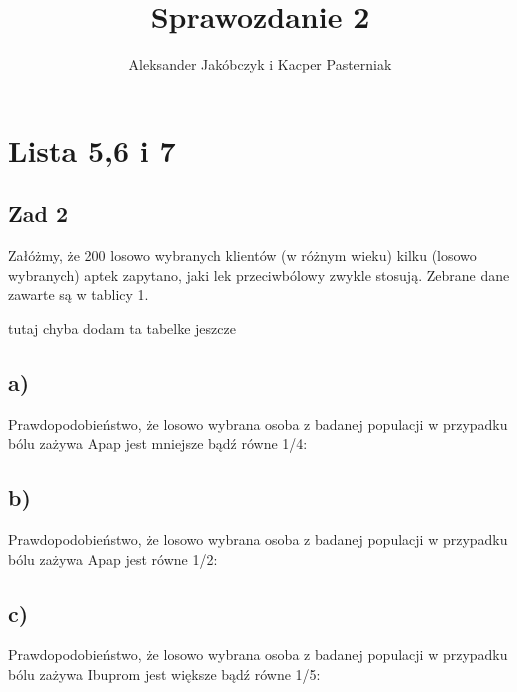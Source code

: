 \documentclass[12pt]{mwart}\usepackage[]{graphicx}\usepackage[]{color}
\title{Sprawozdanie 2}
\author{Aleksander Jakóbczyk i Kacper Pasterniak}
\date{}
\makeatletter
\newenvironment{kframe}{%
 \def\at@end@of@kframe{}%
 \ifinner\ifhmode%
  \def\at@end@of@kframe{\end{minipage}}%
  \begin{minipage}{\columnwidth}%
 \fi\fi%
 \def\FrameCommand##1{\hskip\@totalleftmargin \hskip-\fboxsep
 \colorbox{shadecolor}{##1}\hskip-\fboxsep
     \hskip-\linewidth \hskip-\@totalleftmargin \hskip\columnwidth}%
 \MakeFramed {\advance\hsize-\width
   \@totalleftmargin\z@ \linewidth\hsize
   \@setminipage}}%
 {\par\unskip\endMakeFramed%
 \at@end@of@kframe}
\makeatother
\begin{document}
\maketitle



\section*{Lista 5,6 i 7}
\subsection*{Zad 2}
Załóżmy, że 200 losowo wybranych klientów (w różnym wieku) kilku (losowo wybranych) aptek zapytano, jaki lek przeciwbólowy zwykle stosują. Zebrane dane zawarte
są w tablicy 1.

tutaj chyba dodam ta tabelke jeszcze

\begin{kframe}


{\ttfamily\noindent\bfseries{}}\end{kframe}

\subsection*{a)}
Prawdopodobieństwo, że losowo wybrana osoba z badanej populacji w przypadku bólu zażywa Apap jest mniejsze bądź równe 1/4:
\subsection*{b)}
Prawdopodobieństwo, że losowo wybrana osoba z badanej populacji w przypadku bólu zażywa Apap jest równe 1/2:
\subsection*{c)}
Prawdopodobieństwo, że losowo wybrana osoba z badanej populacji w przypadku bólu zażywa Ibuprom jest większe bądź równe 1/5:
\end{document}
